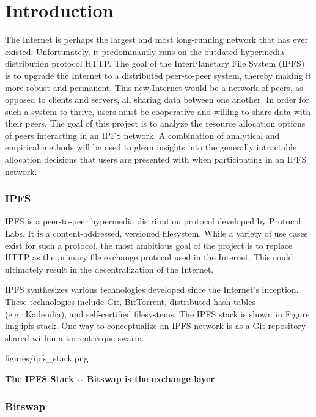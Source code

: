 \hypertarget{introduction}{%
\chapter{Introduction}\label{chapter:introduction}}

The Internet is perhaps the largest and most long-running network that has
ever existed. Unfortunately, it predominantly runs on the outdated
hypermedia distribution protocol HTTP. The goal of the InterPlanetary
File System (IPFS) is to upgrade the Internet to a distributed
peer-to-peer system, thereby making it more robust and permanent. This
new Internet would be a network of peers, as opposed to clients and
servers, all sharing data between one another. In order for such a
system to thrive, users must be cooperative and willing to share data
with their peers. The goal of this project is to analyze the resource
allocation options of peers interacting in an IPFS network. A
combination of analytical and empirical methods will be used to glean
insights into the generally intractable allocation decisions that users
are presented with when participating in an IPFS network.

\hypertarget{ipfs}{%
\subsection{IPFS}\label{ipfs}}

IPFS is a peer-to-peer hypermedia distribution protocol developed by
Protocol Labs. It is a content-addressed, versioned filesystem. While a
variety of use cases exist for such a protocol, the most ambitious goal
of the project is to replace HTTP as the primary file exchange protocol
used in the Internet. This could ultimately result in the
decentralization of the Internet.

IPFS synthesizes various technologies developed since the Internet's
inception. These technologies include Git, BitTorrent, distributed hash
tables (e.g.~Kademlia), and self-certified filesystems. The IPFS stack
is shown in Figure \href{}{img:ipfs-stack}. One way to conceptualize an
IPFS network is as a Git repository shared within a torrent-esque swarm.

\leavevmode{}%
figures/ipfs\_stack.png

\textbf{The IPFS Stack -\/- Bitswap is the exchange layer}

\hypertarget{bitswap}{%
\subsection{Bitswap}\label{bitswap}}

